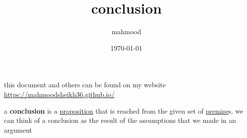 \documentclass[a4paper,12pt]{article}
\author{mahmood}
\date{\today}
\title{conclusion}
\begin{document}
\maketitle
\begin{note}
this document and others can be found on my website\\
\url{https://mahmoodsheikh36.github.io/}
\end{note}
\begin{definition}
a \textbf{conclusion} is a \href{20230401175139-statement.org}{proposition} that is reached from the given set of \href{20230524212241-premise.org}{premise}s. we can think of a conclusion as the result of the assumptions that we made in an argument\\
\end{definition}
\end{document}
